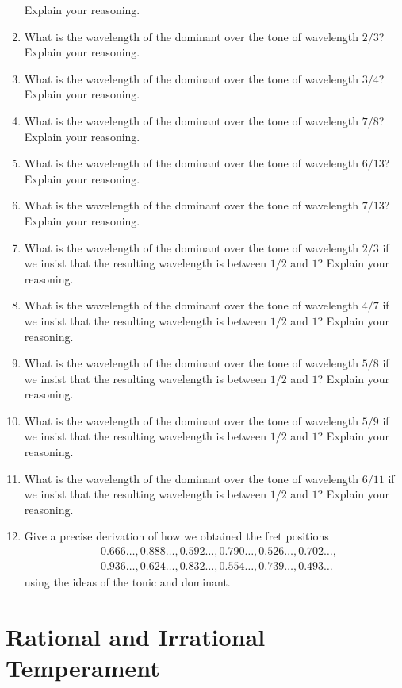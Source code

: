 \begin{enumerate}
\[\]
Explain your reasoning.
\item What is the wavelength of the dominant over the tone of
  wavelength $2/3$? Explain your reasoning.
\item What is the wavelength of the dominant over the tone of
  wavelength $3/4$? Explain your reasoning.
\item What is the wavelength of the dominant over the tone of
  wavelength $7/8$? Explain your reasoning.
\item What is the wavelength of the dominant over the tone of
  wavelength $6/13$? Explain your reasoning.
\item What is the wavelength of the dominant over the tone of
  wavelength $7/13$? Explain your reasoning.
\item What is the wavelength of the dominant over the tone of
  wavelength $2/3$ if we insist that the resulting wavelength is
  between $1/2$ and $1$? Explain your reasoning.
\item What is the wavelength of the dominant over the tone of
  wavelength $4/7$ if we insist that the resulting wavelength is
  between $1/2$ and $1$? Explain your reasoning.
\item What is the wavelength of the dominant over the tone of
  wavelength $5/8$ if we insist that the resulting wavelength is
  between $1/2$ and $1$? Explain your reasoning.
\item What is the wavelength of the dominant over the tone of
  wavelength $5/9$ if we insist that the resulting wavelength is
  between $1/2$ and $1$? Explain your reasoning.
\item What is the wavelength of the dominant over the tone of
  wavelength $6/11$ if we insist that the resulting wavelength is
  between $1/2$ and $1$? Explain your reasoning.
\item Give a precise derivation of how we obtained the fret positions
\begin{align*}
&0.666\dots, 0.888\dots, 0.592\dots, 0.790\dots, 0.526\dots, 0.702\dots, \\
&0.936\dots, 0.624\dots, 0.832\dots, 0.554\dots, 0.739\dots, 0.493\dots
\end{align*}
using the ideas of the tonic and dominant.

\end{enumerate}




\newpage


\section{Rational and Irrational Temperament}



